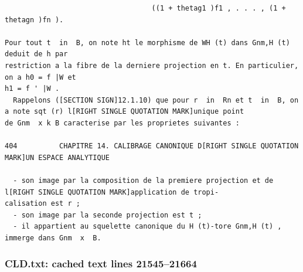 \documentclass[
  11pt,
]{article}
\begin{document}
\begin{lstlisting}
                                   ((1 + thetag1 )f1 , . . . , (1 + thetagn )fn ).

Pour tout t  in  B, on note ht le morphisme de WH (t) dans Gnm,H (t) deduit de h par
restriction a la fibre de la derniere projection en t. En particulier, on a h0 = f |W et
h1 = f ' |W .
  Rappelons ([SECTION SIGN]12.1.10) que pour r  in  Rn et t  in  B, on a note sqt (r) l[RIGHT SINGLE QUOTATION MARK]unique point
de Gnm  x k B caracterise par les proprietes suivantes :

404          CHAPITRE 14. CALIBRAGE CANONIQUE D[RIGHT SINGLE QUOTATION MARK]UN ESPACE ANALYTIQUE

  - son image par la composition de la premiere projection et de l[RIGHT SINGLE QUOTATION MARK]application de tropi-
calisation est r ;
  - son image par la seconde projection est t ;
  - il appartient au squelette canonique du H (t)-tore Gnm,H (t) , immerge dans Gnm  x  B.
\end{lstlisting}

\subsubsection{CLD.txt: cached text lines
21545--21664}\label{cld.txt-cached-text-lines-2154521664}
\end{document}
